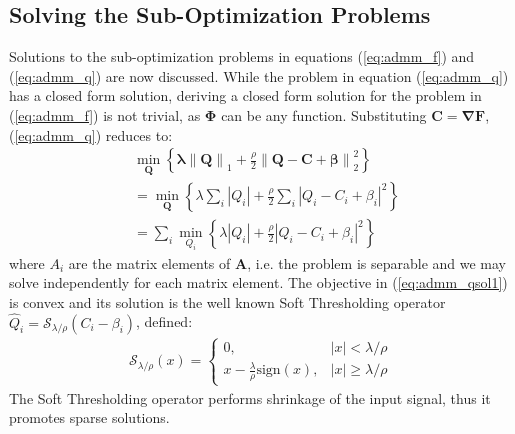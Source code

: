 \documentclass[10pt,twocolumn,letterpaper]{article}
\begin{document}
\subsection{Solving the Sub-Optimization Problems}
Solutions to the sub-optimization problems in equations (\ref{eq:admm_f}) and (\ref{eq:admm_q}) are now discussed. 
While the problem in equation (\ref{eq:admm_q}) has a closed form solution, deriving a closed form solution for the problem in (\ref{eq:admm_f}) is not trivial, as $\mathbf{\Phi}$ can be any function.
Substituting $\mathbf{C=\nabla F}$, (\ref{eq:admm_q}) reduces to:
\begin{equation}
\begin{aligned}
    &\min_{\mathbf{Q}} \left\{\mathbf{\lambda\|Q\|}_1 + \frac{\rho}{2} \mathbf{\|Q - C + \boldsymbol{\beta}\|}_2^2 \right\} \\
    &= \min_{\mathbf{Q}} \left\{\lambda \sum_{i}|Q_i| + \frac{\rho}{2} \sum_{i} |Q_i - C_i + \beta_i|^2 \right\} \\
    &= \sum_i \min_{Q_i} \left\{ \lambda |Q_i| + \frac{\rho}{2}|Q_i - C_i + \beta_i|^2 \right\}
    \label{eq:admm_qsol1}
    \end{aligned}
\end{equation}
where $A_i$ are the matrix elements of $\mathbf{A}$, i.e. the problem is separable and we may solve independently for each matrix element. The objective in (\ref{eq:admm_qsol1}) is convex and its solution is the well known Soft Thresholding operator $\hat{Q}_i = \mathcal{S}_{\lambda/\rho} \left( C_i-\beta_i \right)$, defined:
\begin{equation} \label{eq:S}
\begin{aligned}
    \mathcal{S}_{\lambda/\rho} (x) =
    \begin{cases}
    0, & |x| < \lambda / \rho \\
    x - \frac{\lambda}{\rho} \text{sign}(x), & |x| \geq \lambda / \rho
    \end{cases}
\end{aligned}
\end{equation}
The Soft Thresholding operator performs shrinkage of the input signal, thus it promotes sparse solutions.
\end{document}
